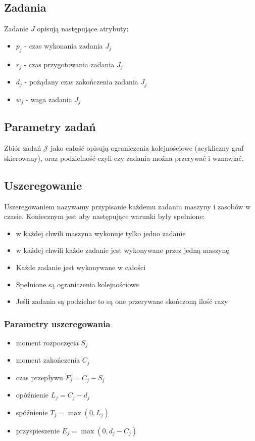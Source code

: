 \documentclass{../notatki}
\begin{document}
\subsection{Zadania}

Zadanie $J$ opisują następujące atrybuty:

\begin{itemize}
  \item $p_j$ - czas wykonania zadania $J_j$
  \item $r_j$ - czas przygotowania zadania $J_j$
  \item $d_j$ - pożądany czas zakończenia zadania $J_j$
  \item $w_j$ - waga zadania $J_j$
\end{itemize}

\subsection{Parametry zadań}

Zbiór zadań $\mathcal{J}$ jako całość opisują ograniczenia
kolejnościowe (acykliczny graf skierowany), oraz
podzielność czyli czy zadania można przerywać i wznawiać.

\subsection{Uszeregowanie}

Uszeregowaniem nazywamy przypisanie każdemu zadaniu maszyny i zasobów w czasie.
Koniecznym jest aby następujące warunki były spełnione:
\begin{itemize}
  \item w każdej chwili maszyna wykonuje tylko jedno zadanie
  \item w każdej chwili każde zadanie jest wykonywane przez jedną maszynę
  \item Każde zadanie jest wykonywane w całości
  \item Spełnione są ograniczenia kolejnościowe
  \item Jeśli zadania są podzielne to są one przerywane skończoną ilość razy
\end{itemize}

\subsubsection{Parametry uszeregowania}

\begin{itemize}
  \item moment rozpoczęcia $S_j$
  \item moment zakończenia $C_j$
  \item czas przepływu $F_j = C_j - S_j$
  \item opóźnienie $L_j = C_j - d_j$
  \item spóźnienie $T_j = \max(0, L_j)$
  \item przyspieszenie $E_j = \max(0, d_j - C_j)$
\end{itemize}
\end{document}
